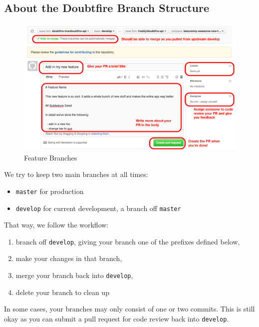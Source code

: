 \documentclass[12pt,a4paper,]{article}
\providecommand{\tightlist}{%
  \setlength{\itemsep}{0pt}\setlength{\parskip}{0pt}}
\begin{document}
\hypertarget{about-the-doubtfire-branch-structure}{\subsection{About the
Doubtfire Branch Structure}\label{about-the-doubtfire-branch-structure}}

\begin{figure}[htbp]
\centering
\includegraphics{43f3131730.png}
\caption{Feature Branches}
\end{figure}

We try to keep two main branches at all times:

\begin{itemize}
\tightlist
\item
  \texttt{master} for production
\item
  \texttt{develop} for current development, a branch off \texttt{master}
\end{itemize}

That way, we follow the workflow:

\begin{enumerate}
\def\labelenumi{\arabic{enumi}.}
\tightlist
\item
  branch off \texttt{develop}, giving your branch one of the prefixes
  defined below,
\item
  make your changes in that branch,
\item
  merge your branch back into \texttt{develop},
\item
  delete your branch to clean up
\end{enumerate}

In some cases, your branches may only consist of one or two commits.
This is still okay as you can submit a pull request for code review back
into \texttt{develop}.
\end{document}
